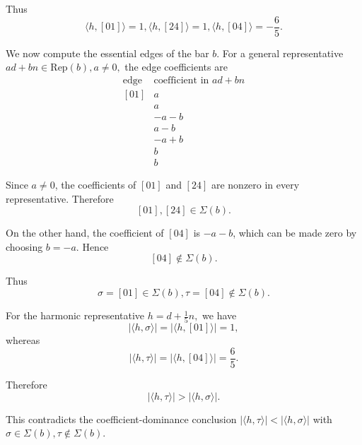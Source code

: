 \documentclass[11pt]{amsart}
\theoremstyle{theorem}
\theoremstyle{remark}
\theoremstyle{definition}
\newcommand{\Rep}{\mathrm{Rep}}
\begin{document}
Thus
\[
\langle h,[01]\rangle=1,
\langle h,[24]\rangle=1,
\langle h,[04]\rangle=-\frac65.
\]


We now compute the essential edges of the bar \(b\).
For a general representative
$
a d+b n\in \Rep(b),
 a\neq 0,
$
the edge coefficients are
\[
\begin{array}{c|c}
\text{edge} & \text{coefficient in } a d+b n\\
\hline
[01] & a \\ 

[24] & a \\ 

[04] & -a-b\\

[13] & a-b \\ 

[23] & -a+b  \\ 

[02] & b\\ 

[14] & b
\end{array}
\]

Since \(a\neq 0\), the coefficients of \([01]\) and \([24]\) are nonzero in
every representative. Therefore
\[
[01],[24]\in \Sigma(b).
\]

On the other hand, the coefficient of \([04]\) is
$
-a-b
$,
which can be made zero by choosing
$
b=-a
$.
Hence
\[
[04]\notin \Sigma(b).
\]

Thus
\[
\sigma=[01]\in \Sigma(b),
\tau=[04]\notin \Sigma(b).
\]

For the harmonic representative
$
h=d+\frac15 n,
$
we have
\[
|\langle h,\sigma\rangle|
=
|\langle h,[01]\rangle|
=
1,
\]
whereas
\[
|\langle h,\tau\rangle|
=
|\langle h,[04]\rangle|
=
\frac65.
\]

Therefore
\[
|\langle h,\tau\rangle|
>
|\langle h,\sigma\rangle|.
\]

This contradicts the coefficient-dominance conclusion
$
|\langle h,\tau\rangle|
<
|\langle h,\sigma\rangle|
$
with
$
\sigma\in\Sigma(b),
\tau\notin\Sigma(b).
$
\end{document}
